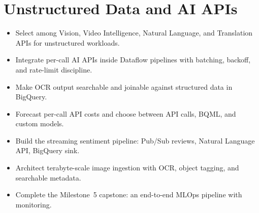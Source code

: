 \chapter{Unstructured Data and AI APIs}

\begin{objectives}
\begin{itemize}
    \item Select among Vision, Video Intelligence, Natural Language, and Translation APIs for unstructured workloads.
    \item Integrate per-call AI APIs inside Dataflow pipelines with batching, backoff, and rate-limit discipline.
    \item Make OCR output searchable and joinable against structured data in BigQuery.
    \item Forecast per-call API costs and choose between API calls, BQML, and custom models.
    \item Build the streaming sentiment pipeline: Pub/Sub reviews, Natural Language API, BigQuery sink.
    \item Architect terabyte-scale image ingestion with OCR, object tagging, and searchable metadata.
    \item Complete the Milestone~5 capstone: an end-to-end MLOps pipeline with monitoring.
\end{itemize}
\end{objectives}

